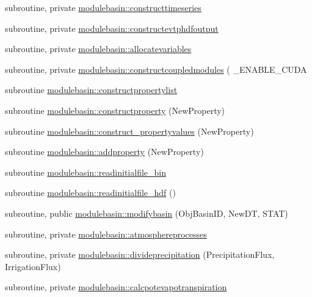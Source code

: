 \begin{DoxyCompactItemize}
subroutine, private \mbox{\hyperlink{namespacemodulebasin_a485c76ff915dee4b9ba1ca5c7e79d462}{modulebasin\+::constructtimeseries}}
\item 
subroutine, private \mbox{\hyperlink{namespacemodulebasin_abec73ddab1c13a2f52007dbd7a5adf56}{modulebasin\+::constructevtphdfoutput}}
\item 
subroutine, private \mbox{\hyperlink{namespacemodulebasin_a86eb7d3c4f70fdc55c9b4a4945a8ad9b}{modulebasin\+::allocatevariables}}
\item 
subroutine, private \mbox{\hyperlink{namespacemodulebasin_a3b96c67f2670be0a100bc48d94ecb93d}{modulebasin\+::constructcoupledmodules}} ( \+\_\+\+E\+N\+A\+B\+L\+E\+\_\+\+C\+U\+DA
\item 
subroutine \mbox{\hyperlink{namespacemodulebasin_a914a8d07507d5ca843132c144c8e61f7}{modulebasin\+::constructpropertylist}}
\item 
subroutine \mbox{\hyperlink{namespacemodulebasin_afc1a708f812fbecd655d2ec2ec7d7ae7}{modulebasin\+::constructproperty}} (New\+Property)
\item 
subroutine \mbox{\hyperlink{namespacemodulebasin_a65271cf9b17250a778002a527ee4c253}{modulebasin\+::construct\+\_\+propertyvalues}} (New\+Property)
\item 
subroutine \mbox{\hyperlink{namespacemodulebasin_ad6d474b32a2a819360f61e25e869f0bd}{modulebasin\+::addproperty}} (New\+Property)
\item 
subroutine \mbox{\hyperlink{namespacemodulebasin_a4ea226fec981510a8e050dbe3bc285ab}{modulebasin\+::readinitialfile\+\_\+bin}}
\item 
subroutine \mbox{\hyperlink{namespacemodulebasin_a52545eff06912899ced860eb99799977}{modulebasin\+::readinitialfile\+\_\+hdf}} ()
\item 
subroutine, public \mbox{\hyperlink{namespacemodulebasin_a5ce7ee123ed0331d3bcb0ba4db4a9797}{modulebasin\+::modifybasin}} (Obj\+Basin\+ID, New\+DT, S\+T\+AT)
\item 
subroutine, private \mbox{\hyperlink{namespacemodulebasin_a1dc5e66cf881f77967c196e5413f7ff2}{modulebasin\+::atmosphereprocesses}}
\item 
subroutine, private \mbox{\hyperlink{namespacemodulebasin_a4c084fc559ce2dc2a135a4e171d15024}{modulebasin\+::divideprecipitation}} (Precipitation\+Flux, Irrigation\+Flux)
\item 
subroutine, private \mbox{\hyperlink{namespacemodulebasin_a112f8b0445f6c2ff174a1292c9efd8c2}{modulebasin\+::calcpotevapotranspiration}}
\item 

\end{DoxyCompactItemize}

